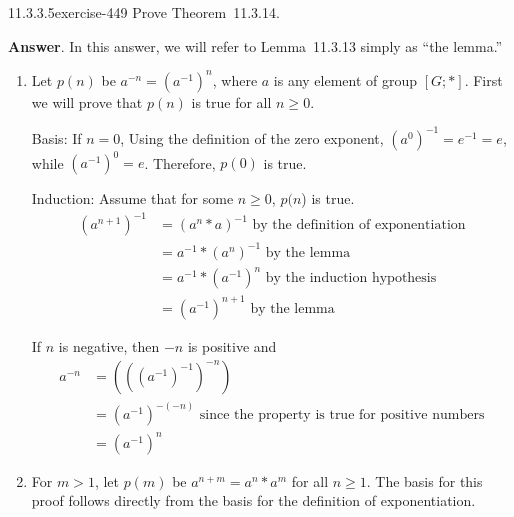 \documentclass[twoside,10pt,]{book}
\numberwithin{equation}{section}
\begin{document}
\begin{divisionsolution}{11.3.3.5}{}{exercise-449}%
\hypertarget{p-3941}{}%
Prove Theorem~11.3.14.%
\par\smallskip%
\noindent\textbf{Answer}.\quad%
\hypertarget{p-3942}{}%
In this answer, we will refer to Lemma~11.3.13 simply as ``the lemma.''%
\par
\hypertarget{p-3943}{}%
\leavevmode%
\begin{enumerate}[label=(\alph*)]
\item\hypertarget{li-1792}{}\hypertarget{p-3944}{}%
Let \(p(n)\) be \(a^{-n}= \left(a^{-1}\right)^n\), where \(a\) is any element of group \([G; *]\). First we will prove that \(p(n)\) is true for all \(n \geq  0\).%
\par
\hypertarget{p-3945}{}%
Basis: If \(n = 0\), Using the definition of the zero exponent,  \(\left(a^0\right)^{-1} = e^{-1} = e\),  while \(\left(a^{-1}\right)^0= e\). Therefore, \(p(0)\) is true.%
\par
\hypertarget{p-3946}{}%
Induction: Assume that for some \(n \geq  0\), \(p(n\)) is true.%
\begin{equation*}
\begin{split}
\left(a^{n+1}\right)^{-1} &= \left(a^n*a\right)^{-1}\textrm{    by the definition of exponentiation}\\
& =a^{-1}*\left(a^n\right)^{-1}\textrm{       by the lemma}\\
& = a^{-1}*\left(a^{-1}\right)^n\textrm{      by the induction hypothesis}\\
& = \left(a^{-1}\right)^{n+1} \textrm{   by the lemma}	
\end{split}
\end{equation*}
%
\par
\hypertarget{p-3947}{}%
If \(n\) is negative, then \(-n\) is positive and%
\begin{equation*}
\begin{split}
a^{-n} & = \left(\left(\left(a^{-1}\right)^{-1}\right)^{-n} \right)\\
& =\left(a^{-1}\right)^{-(-n)}\textrm{    since the property is true for positive numbers}\\
& =\left(a^{-1}\right)^n
\end{split}
\end{equation*}
%
\item\hypertarget{li-1793}{}\hypertarget{p-3948}{}%
For \(m > 1\), let \(p(m)\) be \(a^{n+m}=a^n*a^m\) for all \(n\geq 1\). The basis for this proof follows directly from the basis for the definition of exponentiation.%

\end{enumerate}
\end{divisionsolution}
\end{document}
